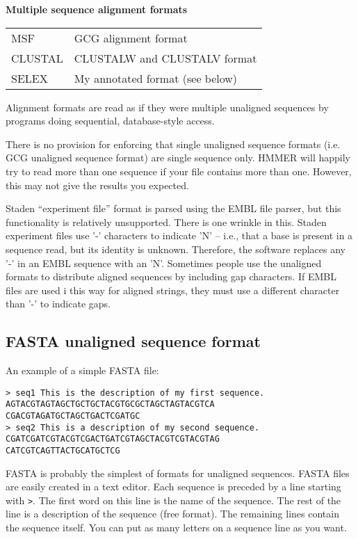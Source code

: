 \textbf{Multiple sequence alignment formats}
\begin{tabular}{ll}
MSF     &   GCG alignment format \\
CLUSTAL &   CLUSTALW and CLUSTALV format \\
SELEX   &   My annotated format (see below)\\
\end{tabular}

Alignment formats are read as if they were multiple unaligned
sequences by programs doing sequential, database-style access.

There is no provision for enforcing that single unaligned sequence
formats (i.e. GCG unaligned sequence format) are single sequence
only. HMMER will happily try to read more than one sequence if your
file contains more than one. However, this may not give the results
you expected.

Staden ``experiment file'' format is parsed using the EMBL file
parser, but this functionality is relatively unsupported. There is one
wrinkle in this. Staden experiment files use '-' characters to
indicate 'N' -- i.e., that a base is present in a sequence read, but
its identity is unknown. Therefore, the software replaces any '-' in
an EMBL sequence with an 'N'. Sometimes people use the unaligned
formats to distribute aligned sequences by including gap
characters. If EMBL files are used i this way for aligned strings,
they must use a different character than '-' to indicate gaps.

\subsection{FASTA unaligned sequence format}

An example of a simple FASTA file: 

\begin{verbatim}
> seq1 This is the description of my first sequence.
AGTACGTAGTAGCTGCTGCTACGTGCGCTAGCTAGTACGTCA
CGACGTAGATGCTAGCTGACTCGATGC
> seq2 This is a description of my second sequence.
CGATCGATCGTACGTCGACTGATCGTAGCTACGTCGTACGTAG
CATCGTCAGTTACTGCATGCTCG
\end{verbatim}

FASTA is probably the simplest of formats for unaligned sequences.
FASTA files are easily created in a text editor.  Each sequence is
preceded by a line starting with \verb+>+. The first word on this line
is the name of the sequence. The rest of the line is a description of
the sequence (free format). The remaining lines contain the sequence
itself. You can put as many letters on a sequence line as you want.

